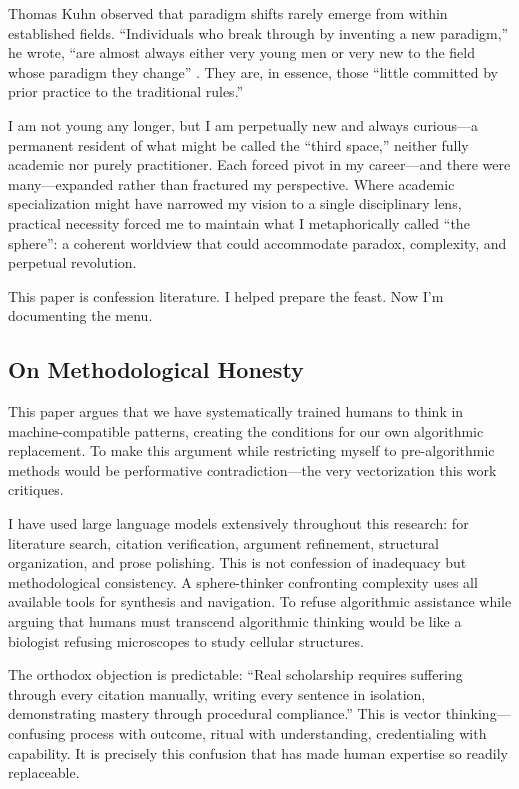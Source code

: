 Thomas Kuhn observed that paradigm shifts rarely emerge from within established fields. ``Individuals who break through by inventing a new paradigm,'' he wrote, ``are almost always either very young men or very new to the field whose paradigm they change'' \citep{kuhn1962}. They are, in essence, those ``little committed by prior practice to the traditional rules.''

I am not young any longer, but I am perpetually new and always curious---a permanent resident of what might be called the ``third space,'' neither fully academic nor purely practitioner. Each forced pivot in my career---and there were many---expanded rather than fractured my perspective. Where academic specialization might have narrowed my vision to a single disciplinary lens, practical necessity forced me to maintain what I metaphorically called ``the sphere'': a coherent worldview that could accommodate paradox, complexity, and perpetual revolution.

This paper is confession literature. I helped prepare the feast. Now I'm documenting the menu.

\subsection*{On Methodological Honesty}

This paper argues that we have systematically trained humans to think in machine-compatible patterns, creating the conditions for our own algorithmic replacement. To make this argument while restricting myself to pre-algorithmic methods would be performative contradiction---the very vectorization this work critiques.

I have used large language models extensively throughout this research: for literature search, citation verification, argument refinement, structural organization, and prose polishing. This is not confession of inadequacy but methodological consistency. A sphere-thinker confronting complexity uses all available tools for synthesis and navigation. To refuse algorithmic assistance while arguing that humans must transcend algorithmic thinking would be like a biologist refusing microscopes to study cellular structures.

The orthodox objection is predictable: ``Real scholarship requires suffering through every citation manually, writing every sentence in isolation, demonstrating mastery through procedural compliance.'' This is vector thinking---confusing process with outcome, ritual with understanding, credentialing with capability. It is precisely this confusion that has made human expertise so readily replaceable.

